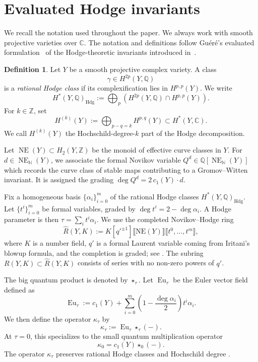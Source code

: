 \documentclass{amsart}
\theoremstyle{definition}
\newtheorem{definition}[theorem]{Definition}
\theoremstyle{remark}
\newcommand{\CC}{\mathbb C}
\newcommand{\QQ}{\mathbb Q}
\newcommand{\ZZ}{\mathbb Z}
\newcommand{\NE}{\operatorname{NE}}
\newcommand{\Hdg}{\mathrm{Hdg}}
\begin{document}
 

\section{Evaluated Hodge invariants}
\label{sec:quantum-products}

We recall the notation used throughout the paper. We always work with smooth projective varieties over \(\mathbb C\).  The notation and definitions follow Gu\'er\'e's evaluated formulation~\citep{guere2026irrationality} of the Hodge-theoretic invariants introduced in~\citep{Katzarkov2025BirationalIF}.

\begin{definition}\label{def:hodge-hochschild}
Let \(Y\) be a smooth projective complex variety.  A class
\[
  \gamma\in H^{2p}(Y,\QQ)
\]
is a \emph{rational Hodge class} if its complexification lies in \(H^{p,p}(Y)\).  We write
\[
  H^*(Y,\QQ)_{\Hdg}:=\bigoplus_p( H^{2p}(Y,\QQ)\cap H^{p,p}(Y)).
\]
For \(k\in\ZZ\), set
\[
  H^{(k)}(Y):=\bigoplus_{p-q=k}H^{p,q}(Y)\subset H^*(Y,\CC).
\]
We call \(H^{(k)}(Y)\) the Hochschild-degree-\(k\) part of the Hodge decomposition.
\end{definition}

Let \(\NE(Y)\subset H_2(Y,\ZZ)\) be the monoid of effective curve classes in $Y$. For \(d\in\NE_{\mathbb N}(Y)\), we associate the formal Novikov variable \(Q^d\in \QQ[\NE_{\mathbb N}(Y)]\) which records the curve class of stable maps
contributing to a Gromov--Witten invariant. It is assigned the grading $\deg Q^{d}=2\,c_{1}(Y)\cdot d$.

Fix a homogeneous basis $\{\alpha_{i}\}_{i=0}^{m}$ of the rational Hodge classes
$H^{*}(Y,\mathbb{Q})_{\mathrm{Hdg}}$. Let $\{t^{i}\}_{i=0}^{m}$ be formal variables, graded by $\deg t^{i}=2-\deg\alpha_{i}$. A Hodge
parameter is then $\tau=\sum_{i}t^{i}\alpha_{i}$. We use the completed Novikov--Hodge ring
\[
  \widehat R(Y,K)
  :=
  K[q'^{\pm1}]
  \llbracket \mathrm{NE}(Y)\rrbracket
  \llbracket t^{0},\dots,t^{m}\rrbracket ,
\]
where \(K\) is a number field, \(q'\) is a formal Laurent variable coming from Iritani's blowup formula, and the completion is graded; see
\cite[Section~2.2]{Iritani2023QuantumCO}. The subring $R(Y,K)\subset \widehat R(Y,K)$ consists of series with no non-zero powers of \(q'\).

The big quantum product is denoted by \(\star_\tau\). Let
\(\operatorname{Eu}_\tau\) be the Euler vector field defined as 
\[
  \operatorname{Eu}_\tau
  :=
  c_1(Y)
  +
  \sum_{i=0}^{m}
  \left(1-\frac{\deg\alpha_i}{2}\right)t^i\alpha_i.
\]
We then define the operator $\kappa_\tau$ by
\[
  \kappa_\tau:=\operatorname{Eu}_\tau\star_\tau(-).
\]
At \(\tau=0\), this specializes to the small quantum multiplication operator
\[
  \kappa_0=c_1(Y)\star_0(-).
\]
The operator \(\kappa_\tau\) preserves rational Hodge classes and Hochschild
degree \cite[Proposition~14]{guere2026irrationality}.
\end{document}
